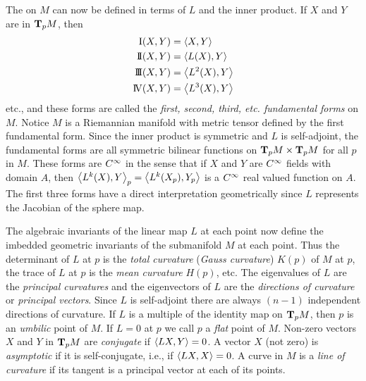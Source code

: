 \documentclass[../main]{subfiles}
\begin{document}
The  on $M$ can now be defined in terms of $L$ and the inner product. If $X$ and $Y$ are in $\tangentspace{M}{p}$, then 
\begin{align*}
    \firstForm(X,Y) &= \ip{X}{Y}\\
    \secondForm(X,Y) &= \ip{L(X)}{Y}\\
    \thirdForm(X,Y) &= \ip{L^2(X)}{Y}\\
    \fourthForm(X,Y) &= \ip{L^3(X)}{Y}
\end{align*}
etc., and these forms are called the \emph{first, second, third, etc. fundamental forms} on $M$. Notice $M$ is a Riemannian manifold with metric tensor defined by the first fundamental form. Since the inner product is symmetric and $L$ is self-adjoint, the fundamental forms are all symmetric bilinear functions on $\tangentspace{M}{p}\times \tangentspace{M}{p}$ for all $p$ in $M$. These forms are $\CInfty$ in the sense that if $X$ and $Y$ are $\CInfty$ fields with domain $A$, then $\ip{L^k(X)}{Y}_p=\ip{L^k(X_p)}{Y_p}$ is a $\CInfty$ real valued function on $A$. The first three forms have a direct interpretation geometrically since $L$ represents the Jacobian of the sphere map.

The algebraic invariants of the linear map $L$ at each point now define the imbedded geometric invariants of the submanifold $M$ at each point. Thus the determinant of $L$ at $p$ is the \emph{total curvature} (\emph{Gauss curvature}) $K(p)$ of $M$ at $p$, the trace of $L$ at $p$ is the \emph{mean curvature} $H(p)$, etc. The eigenvalues of $L$ are the \emph{principal curvatures} and the eigenvectors of $L$ are the \emph{directions of curvature} or \emph{principal vectors}. Since $L$ is self-adjoint there are always $(n-1)$ independent directions of curvature. If $L$ is a multiple of the identity map on $\tangentspace{M}{p}$, then $p$ is an \emph{umbilic} point of $M$. If $L=0$ at $p$ we call $p$ a \emph{flat} point of $M$. Non-zero vectors $X$ and $Y$ in $\tangentspace{M}{p}$ are \emph{conjugate} if $\ip{LX}{Y}=0$. A vector $X$ (not zero) is \emph{asymptotic} if it is self-conjugate, i.e., if $\ip{LX}{X}=0$. A curve in $M$ is a \emph{line of curvature} if its tangent is a principal vector at each of its points.
\end{document}
